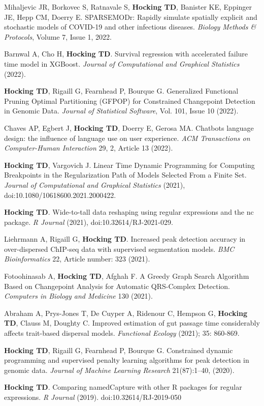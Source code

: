 \documentclass[margin,line]{res}
\begin{document}
\begin{resume}
Mihaljevic JR, Borkovec S, Ratnavale S, \textbf{Hocking TD}, Banister
KE, Eppinger JE, Hepp CM, Doerry E. SPARSEMODr: Rapidly simulate
spatially explicit and stochastic models of COVID-19 and other
infectious diseases. {\it Biology Methods \& Protocols}, Volume 7,
Issue 1, 2022.

Barnwal A, Cho H, {\bf Hocking TD}. Survival regression with
accelerated failure time model in XGBoost. {\it Journal of
  Computational and Graphical Statistics} (2022).

{\bf Hocking TD}, Rigaill G, Fearnhead P, Bourque G. Generalized
Functional Pruning Optimal Partitioning (GFPOP) for Constrained
Changepoint Detection in Genomic Data. {\it Journal of Statistical
  Software}, Vol. 101, Issue 10 (2022).

Chaves AP, Egbert J, {\bf Hocking TD}, Doerry E, Gerosa MA. Chatbots
language design: the influence of language use on user
experience. {\it ACM Transactions on Computer-Human Interaction} 29,
2, Article 13 (2022).

{\bf Hocking TD}, Vargovich J. Linear Time Dynamic Programming for
Computing Breakpoints in the Regularization Path of Models Selected
From a Finite Set. {\it Journal of Computational and Graphical
  Statistics} (2021), doi:10.1080/10618600.2021.2000422.

{\bf Hocking TD}. Wide-to-tall data reshaping using regular
expressions and the nc package. {\it R Journal} (2021),
doi:10.32614/RJ-2021-029.

Liehrmann A, Rigaill G, {\bf Hocking TD}. Increased peak detection
accuracy in over-dispersed ChIP-seq data with supervised segmentation
models. {\it BMC Bioinformatics} 22, Article number: 323 (2021).

Fotoohinasab A, {\bf Hocking TD}, Afghah F. A Greedy Graph Search
Algorithm Based on Changepoint Analysis for Automatic QRS-Complex
Detection. {\it Computers in Biology and Medicine} 130 (2021).

Abraham A, Prys-Jones T, De Cuyper A, Ridenour C, Hempson G, {\bf
  Hocking TD}, Clauss M, Doughty C. Improved estimation of gut passage
time considerably affects trait-based dispersal models. {\it
  Functional Ecology} (2021); 35: 860-869.

{\bf Hocking TD}, Rigaill G, Fearnhead P, Bourque G. Constrained
dynamic programming and supervised penalty learning algorithms for
peak detection in genomic data. {\it Journal of Machine Learning
  Research} 21(87):1--40, (2020).

{\bf Hocking TD}. Comparing namedCapture with other R packages for
regular expressions. {\it R Journal} (2019). doi:10.32614/RJ-2019-050


\end{resume}
\end{document}
